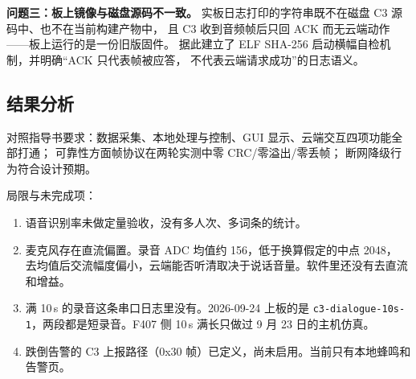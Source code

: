 \textbf{问题三：板上镜像与磁盘源码不一致。}
实板日志打印的字符串既不在磁盘 C3 源码中、也不在当前构建产物中，
且 C3 收到音频帧后只回 ACK 而无云端动作——板上运行的是一份旧版固件。
据此建立了 ELF SHA-256 启动横幅自检机制，并明确``ACK 只代表帧被应答，
不代表云端请求成功''的日志语义。

\subsection{结果分析}
对照指导书要求：数据采集、本地处理与控制、GUI 显示、云端交互四项功能全部打通；
可靠性方面帧协议在两轮实测中零 CRC/零溢出/零丢帧；
断网降级行为符合设计预期。

局限与未完成项：
\begin{enumerate}[label=（\arabic*）]
\item 语音识别率未做定量验收，没有多人次、多词条的统计。
\item 麦克风存在直流偏置。录音 ADC 均值约 156，低于换算假定的中点 2048，
去均值后交流幅度偏小，云端能否听清取决于说话音量。软件里还没有去直流和增益。
\item 满 10\,s 的录音这条串口日志里没有。2026-09-24 上板的是
\texttt{c3-dialogue-10s-1}，两段都是短录音。F407 侧 10\,s 满长只做过 9 月 23 日的主机仿真。
\item 跌倒告警的 C3 上报路径（0x30 帧）已定义，尚未启用。当前只有本地蜂鸣和告警页。
\end{enumerate}
